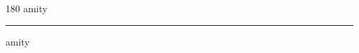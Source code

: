 
\begin{frame}
\begin{center}
\begin{turn}{180}
{\fontsize{2.5cm}{1em}\selectfont amity}
\end{turn}
\vspace{1em}\par  
\hrule
\vspace{1em}\par  
{\fontsize{2.5cm}{1em}\selectfont amity}
\end{center}
\end{frame}
